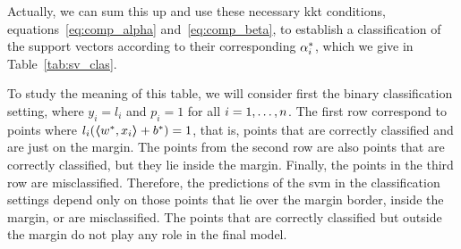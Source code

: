 %
Actually, we can sum this up and use these necessary \acrshort{kkt} conditions, equations~\eqref{eq:comp_alpha} and~\eqref{eq:comp_beta}, to establish a classification of the support vectors according to their corresponding $\opt{\alpha}_i$, which we give in Table~\ref{tab:sv_clas}.
%
\begin{table}[t!]
    \caption{Classification of the support vectors in terms of the value of $\opt{\alpha}_i$.}
    \label{tab:sv_clas}
    \centering
\end{table}
%
To study the meaning of this table, we will consider first the binary classification setting, where $y_i = l_i$ and $p_i=1$ for all $i=1, \ldots, n$. The first row correspond to points where $l_i (\bm{\left\langle} {w}^*, x_i \bm{\right\rangle} + {b}^*) = 1$, that is, points that are correctly classified and are just on the margin. The points from the second row are also points that are correctly classified, but they lie inside the margin. Finally, the points in the third row are misclassified.
Therefore, the predictions of the \acrshort{svm} in the classification settings depend only on those points that lie over the margin border, inside the margin, or are misclassified. The points that are correctly classified but outside the margin do not play any role in the final model.
%

